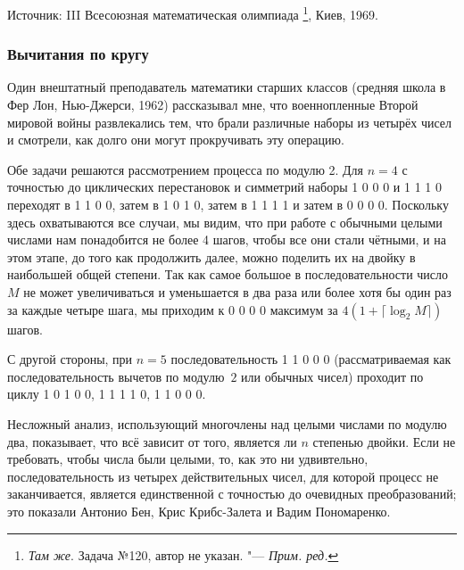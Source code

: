 \documentclass[twoside]{book}
\begin{document}
\medskip
{%
Источник: III Всесоюзная математическая олимпиада%
\footnote{%
\emph{Там же}. Задача №120, автор не указан. "--- \emph{Прим. ред.}}, Киев, 1969. 

}

\subsubsection*{Вычитания по кругу}%

Один внештатный преподаватель математики старших классов (средняя школа в Фер Лон, Нью-Джерси, 1962)
рассказывал мне, что военнопленные Второй мировой войны развлекались
тем, что брали различные наборы из четырёх чисел и смотрели, как долго
они могут прокручивать эту операцию.

\medskip

Обе задачи решаются рассмотрением процесса по модулю 2.
Для $n=4$ с точностью до циклических перестановок и симметрий наборы
1 0 0 0 
и
1 1 1 0 переходят в
1 1 0 0, затем в
1 0 1 0, затем в
1 1 1 1 и затем в
0 0 0 0.
Поскольку здесь охватываются все случаи, мы видим, что при работе с обычными целыми числами нам понадобится не более 4 шагов, чтобы все они стали чётными, и на этом этапе, до того как продолжить далее, можно поделить их на двойку в наибольшей общей степени.
Так как самое большое в последовательности число~$M$ не может увеличиваться и уменьшается в два раза или более хотя бы один раз за каждые четыре шага, 
мы приходим к 
0 0 0 0 
максимум за $4(1+\lceil\log_2 M\rceil)$ шагов.

С другой стороны, при $n=5$ последовательность 
1 1 0 0 0
(рассматриваемая как последовательность вычетов по модулю~$2$ или обычных чисел)
проходит по циклу 
1 0 1 0 0, 
1 1 1 1 0, 
1 1 0 0 0.\heart 

\medskip
Несложный анализ, использующий многочлены над целыми числами по модулю два, показывает, что всё зависит от того, является ли $n$ степенью двойки.
%
Если не требовать, чтобы числа были целыми, то, как это ни удвивтельно, последовательность из четырех действительных чисел, для
которой процесс не заканчивается, является единственной с точностью до
очевидных преобразований; это показали Антонио Бен, Крис Крибс-Залета
и Вадим Пономаренко.
\end{document}
